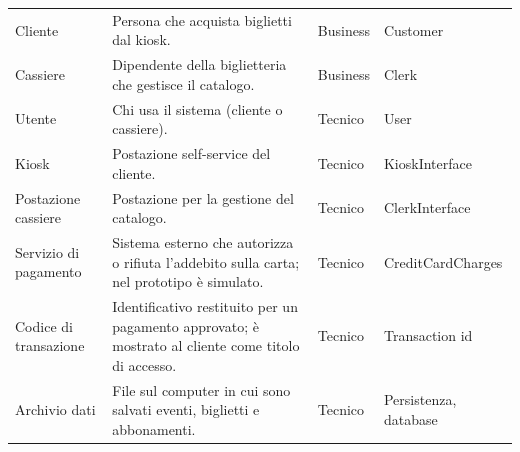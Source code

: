 \begin{center}
\begin{tabular}{@{}L{2.9cm}L{7.0cm}L{1.5cm}L{3.0cm}@{}}
Cliente & Persona che acquista biglietti dal kiosk. & Business & Customer \\
Cassiere & Dipendente della biglietteria che gestisce il catalogo. & Business & Clerk \\
Utente & Chi usa il sistema (cliente o cassiere). & Tecnico & User \\
Kiosk & Postazione self-service del cliente. & Tecnico & KioskInterface \\
Postazione cassiere & Postazione per la gestione del catalogo. & Tecnico & ClerkInterface \\
Servizio di pagamento & Sistema esterno che autorizza o rifiuta l'addebito sulla carta; nel prototipo è simulato. & Tecnico & CreditCardCharges \\
Codice di transazione & Identificativo restituito per un pagamento approvato; è mostrato al cliente come titolo di accesso. & Tecnico & Transaction id \\
Archivio dati & File sul computer in cui sono salvati eventi, biglietti e abbonamenti. & Tecnico & Persistenza, database \\
\bottomrule
\end{tabular}
\end{center}
\normalsize
